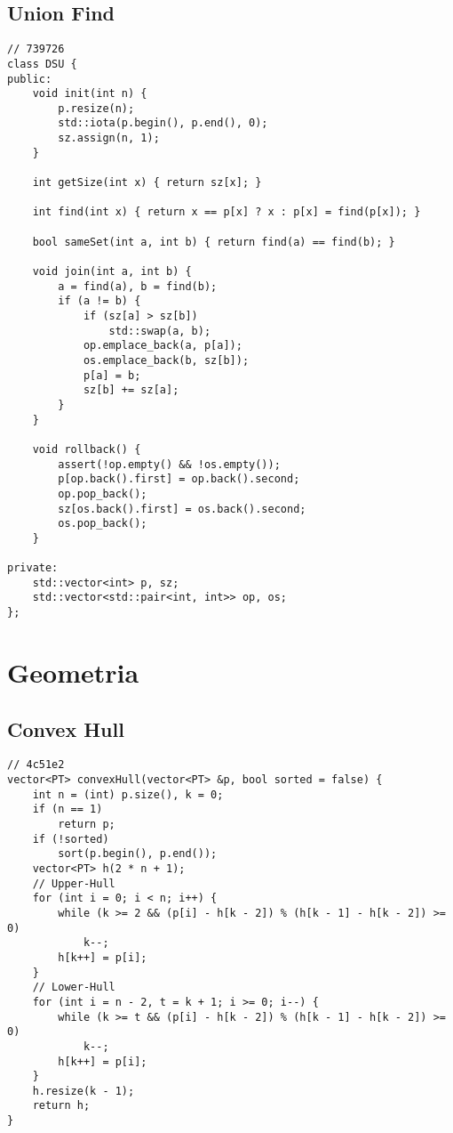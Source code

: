 \documentclass[12pt, a4paper, twoside]{article}
\begin{document}
\subsection{Union Find
}
\begin{lstlisting}
// 739726
class DSU {
public:
	void init(int n) {
		p.resize(n);
		std::iota(p.begin(), p.end(), 0);
		sz.assign(n, 1);
	}

	int getSize(int x) { return sz[x]; }

	int find(int x) { return x == p[x] ? x : p[x] = find(p[x]); }

	bool sameSet(int a, int b) { return find(a) == find(b); }

	void join(int a, int b) {
		a = find(a), b = find(b);
		if (a != b) {
			if (sz[a] > sz[b])
				std::swap(a, b);
			op.emplace_back(a, p[a]);
			os.emplace_back(b, sz[b]);
			p[a] = b;
			sz[b] += sz[a];
		}
	}

	void rollback() {
		assert(!op.empty() && !os.empty());
		p[op.back().first] = op.back().second;
		op.pop_back();
		sz[os.back().first] = os.back().second;
		os.pop_back();
	}

private:
	std::vector<int> p, sz;
	std::vector<std::pair<int, int>> op, os;
};
\end{lstlisting}



%
%

\section{Geometria}

\subsection{Convex Hull
}
\begin{lstlisting}
// 4c51e2
vector<PT> convexHull(vector<PT> &p, bool sorted = false) {
	int n = (int) p.size(), k = 0;
	if (n == 1)
		return p;
	if (!sorted)
		sort(p.begin(), p.end());
	vector<PT> h(2 * n + 1);
	// Upper-Hull
	for (int i = 0; i < n; i++) {
		while (k >= 2 && (p[i] - h[k - 2]) % (h[k - 1] - h[k - 2]) >= 0)
			k--;
		h[k++] = p[i];
	}
	// Lower-Hull
	for (int i = n - 2, t = k + 1; i >= 0; i--) {
		while (k >= t && (p[i] - h[k - 2]) % (h[k - 1] - h[k - 2]) >= 0)
			k--;
		h[k++] = p[i];
	}
	h.resize(k - 1);
	return h;
}
\end{lstlisting}
\end{document}
